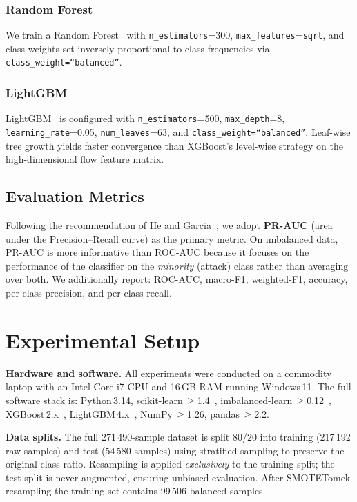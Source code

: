 \documentclass[conference]{IEEEtran}
\begin{document}
\subsubsection{Random Forest}
We train a Random Forest~\cite{breiman2001} with
\texttt{n\_estimators}=300, \texttt{max\_features}=\texttt{sqrt},
and class weights set inversely proportional to class frequencies via
\texttt{class\_weight=``balanced''}.

\subsubsection{LightGBM}
LightGBM~\cite{ke2017lightgbm} is configured with
\texttt{n\_estimators}=500, \texttt{max\_depth}=8,
\texttt{learning\_rate}=0.05, \texttt{num\_leaves}=63,
and \texttt{class\_weight=``balanced''}.
Leaf-wise tree growth yields faster convergence than XGBoost's
level-wise strategy on the high-dimensional flow feature matrix.

\subsection{Evaluation Metrics}

Following the recommendation of He and Garcia~\cite{he2009}, we adopt
\textbf{PR-AUC} (area under the Precision–Recall curve) as the
primary metric.  On imbalanced data, PR-AUC is more informative than
ROC-AUC because it focuses on the performance of the classifier on the
\textit{minority} (attack) class rather than averaging over both.
We additionally report: ROC-AUC, macro-F1, weighted-F1, accuracy,
per-class precision, and per-class recall.

\section{Experimental Setup}
\label{sec:setup}

\textbf{Hardware and software.}
All experiments were conducted on a commodity laptop with an Intel Core
i7 CPU and 16\,GB RAM running Windows\,11.  The full software stack is:
Python\,3.14, scikit-learn\,$\geq$1.4~\cite{pedregosa2011},
imbalanced-learn\,$\geq$0.12~\cite{lemaitre2017},
XGBoost\,2.x~\cite{chen2016xgboost},
LightGBM\,4.x~\cite{ke2017lightgbm},
NumPy\,$\geq$1.26, pandas\,$\geq$2.2.

\textbf{Data splits.}
The full 271\,490-sample dataset is split 80/20 into training
(217\,192 raw samples) and test (54\,580 samples) using stratified
sampling to preserve the original class ratio.  Resampling is
applied \textit{exclusively} to the training split; the test split
is never augmented, ensuring unbiased evaluation.
After SMOTETomek resampling the training set contains 99\,506 balanced
samples.
\end{document}
